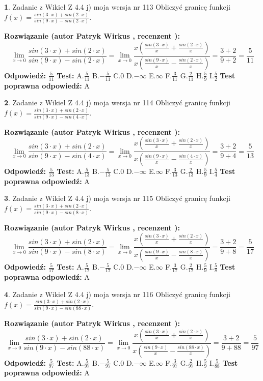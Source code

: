 \documentclass[12pt, a4paper]{article}
\theoremstyle{definition} %
\newtheorem{zad}{}
\newcommand{\zadStart}[1]{\begin{zad}#1\newline}
\newcommand{\zadStop}{\end{zad}}
\newcommand{\rozwStart}[2]{\noindent \textbf{Rozwiązanie (autor #1 , recenzent #2): }\newline}
\newcommand{\rozwStop}{\newline}
\newcommand{\odpStart}{\noindent \textbf{Odpowiedź:}\newline}
\newcommand{\odpStop}{\newline}
\newcommand{\testStart}{\noindent \textbf{Test:}\newline}
\newcommand{\testStop}{\newline}
\newcommand{\kluczStart}{\noindent \textbf{Test poprawna odpowiedź:}\newline}
\newcommand{\kluczStop}{\newline}
\begin{document}
\zadStart{Zadanie z Wikieł Z 4.4 j) moja wersja nr 113}
Obliczyć granicę funkcji $f(x)=\frac{sin(3\cdot x) +sin(2\cdot x)}{sin(9\cdot x) -sin(2\cdot x)}$.
\zadStop
\rozwStart{Patryk Wirkus}{}
$$\lim\limits_{x\to 0}\frac{sin(3\cdot x) +sin(2\cdot x)}{sin(9\cdot x) -sin(2\cdot x)}=\lim\limits_{x\to 0}\frac{x(\frac{sin(3\cdot x)}{x}+\frac{sin(2\cdot x)}{x})}{x(\frac{sin(9\cdot x)}{x}-\frac{sin(2\cdot x)}{x})}=\frac{3+2}{9+2} = \frac{5}{11}$$
\rozwStop
\odpStart
$\frac{5}{11}$
\odpStop
\testStart
A.$\frac{5}{11}$
B.$-\frac{5}{11}$
C.$0$
D.$-\infty$
E.$\infty$
F.$\frac{3}{11}$
G.$\frac{2}{11}$
H.$\frac{5}{9}$
I.$\frac{5}{2}$
\testStop
\kluczStart
A
\kluczStop



\zadStart{Zadanie z Wikieł Z 4.4 j) moja wersja nr 114}
Obliczyć granicę funkcji $f(x)=\frac{sin(3\cdot x) +sin(2\cdot x)}{sin(9\cdot x) -sin(4\cdot x)}$.
\zadStop
\rozwStart{Patryk Wirkus}{}
$$\lim\limits_{x\to 0}\frac{sin(3\cdot x) +sin(2\cdot x)}{sin(9\cdot x) -sin(4\cdot x)}=\lim\limits_{x\to 0}\frac{x(\frac{sin(3\cdot x)}{x}+\frac{sin(2\cdot x)}{x})}{x(\frac{sin(9\cdot x)}{x}-\frac{sin(4\cdot x)}{x})}=\frac{3+2}{9+4} = \frac{5}{13}$$
\rozwStop
\odpStart
$\frac{5}{13}$
\odpStop
\testStart
A.$\frac{5}{13}$
B.$-\frac{5}{13}$
C.$0$
D.$-\infty$
E.$\infty$
F.$\frac{3}{13}$
G.$\frac{2}{13}$
H.$\frac{5}{9}$
I.$\frac{5}{4}$
\testStop
\kluczStart
A
\kluczStop



\zadStart{Zadanie z Wikieł Z 4.4 j) moja wersja nr 115}
Obliczyć granicę funkcji $f(x)=\frac{sin(3\cdot x) +sin(2\cdot x)}{sin(9\cdot x) -sin(8\cdot x)}$.
\zadStop
\rozwStart{Patryk Wirkus}{}
$$\lim\limits_{x\to 0}\frac{sin(3\cdot x) +sin(2\cdot x)}{sin(9\cdot x) -sin(8\cdot x)}=\lim\limits_{x\to 0}\frac{x(\frac{sin(3\cdot x)}{x}+\frac{sin(2\cdot x)}{x})}{x(\frac{sin(9\cdot x)}{x}-\frac{sin(8\cdot x)}{x})}=\frac{3+2}{9+8} = \frac{5}{17}$$
\rozwStop
\odpStart
$\frac{5}{17}$
\odpStop
\testStart
A.$\frac{5}{17}$
B.$-\frac{5}{17}$
C.$0$
D.$-\infty$
E.$\infty$
F.$\frac{3}{17}$
G.$\frac{2}{17}$
H.$\frac{5}{9}$
I.$\frac{5}{8}$
\testStop
\kluczStart
A
\kluczStop



\zadStart{Zadanie z Wikieł Z 4.4 j) moja wersja nr 116}
Obliczyć granicę funkcji $f(x)=\frac{sin(3\cdot x) +sin(2\cdot x)}{sin(9\cdot x) -sin(88\cdot x)}$.
\zadStop
\rozwStart{Patryk Wirkus}{}
$$\lim\limits_{x\to 0}\frac{sin(3\cdot x) +sin(2\cdot x)}{sin(9\cdot x) -sin(88\cdot x)}=\lim\limits_{x\to 0}\frac{x(\frac{sin(3\cdot x)}{x}+\frac{sin(2\cdot x)}{x})}{x(\frac{sin(9\cdot x)}{x}-\frac{sin(88\cdot x)}{x})}=\frac{3+2}{9+88} = \frac{5}{97}$$
\rozwStop
\odpStart
$\frac{5}{97}$
\odpStop
\testStart
A.$\frac{5}{97}$
B.$-\frac{5}{97}$
C.$0$
D.$-\infty$
E.$\infty$
F.$\frac{3}{97}$
G.$\frac{2}{97}$
H.$\frac{5}{9}$
I.$\frac{5}{88}$
\testStop
\kluczStart
A
\kluczStop
\end{document}
